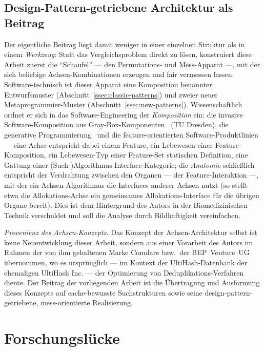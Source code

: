 \subsection{Design-Pattern-getriebene Architektur als Beitrag}\label{ssec:sota-design-contribution}
Der eigentliche Beitrag liegt damit weniger in einer einzelnen Struktur als in einem
\emph{Werkzeug}: Statt das Vergleichsproblem direkt zu lösen, konstruiert diese Arbeit zuerst die
\enquote{Schaufel} --- den Permutations- und Mess-Apparat ---, mit der sich beliebige
Achsen-Kombinationen erzeugen und fair vermessen lassen. Software-technisch ist dieser Apparat eine
Komposition benannter Entwurfsmuster (Abschnitt~\ref{ssec:classic-patterns}) und zweier neuer
Metaprogrammier-Muster (Abschnitt~\ref{ssec:new-patterns}). Wissenschaftlich ordnet er sich in das
Software-Engineering der \emph{Komposition} ein: die invasive Software-Komposition aus
Gray-Box-Komponenten~\cite{assmann2003invasive} (TU Dresden), die generative
Programmierung~\cite{czarnecki2000generative} und die feature-orientierten
Software-Produktlinien~\cite{apel2013feature,batory1992hierarchical} --- eine Achse entspricht dabei
einem Feature, ein Lebewesen einer Feature-Komposition, ein Lebewesen-Typ einer Feature-Set
statischen Definition, eine Gattung einer (Such-)Algorithmus-Interface-Kategorie; die
\emph{Anatomie} schließlich entspricht der Verdrahtung zwischen den Organen --- der
Feature-Interaktion ---, mit der ein Achsen-Algorithmus die Interfaces anderer Achsen nutzt (so
stellt etwa die Allokations-Achse ein gemeinsames Allokations-Interface für die übrigen Organe
bereit). Dies ist dem Hintergrund des Autors in der Biomedizinischen Technik verschuldet und soll
die Analyse durch Bildhaftigkeit vereinfachen.

\emph{Provenienz des Achsen-Konzepts.} Das Konzept der Achsen-Architektur selbst ist keine
Neuentwicklung dieser Arbeit, sondern aus einer Vorarbeit des Autors im Rahmen der von ihm
gehaltenen Marke Comdare bzw.\ der BEP~Venture~UG übernommen, wo es ursprünglich --- im Kontext der
UltiHash-Datenbank der ehemaligen UltiHash Inc. --- der Optimierung von Deduplikations-Verfahren
diente. Der Beitrag der vorliegenden Arbeit ist die Übertragung und Ausformung dieses Konzepts auf
cache-bewusste Suchstrukturen sowie seine design-pattern-getriebene, mess-orientierte Realisierung.

\section{Forschungslücke}\label{sec:gap}


